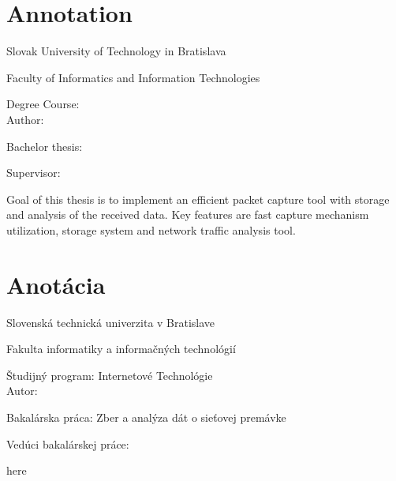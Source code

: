 
\thispagestyle{empty}

\section*{Annotation}

\begin{minipage}[t]{1\columnwidth}%
Slovak University of Technology in Bratislava 

Faculty of Informatics and Information Technologies

Degree Course: \myStudyProgram\\

Author: \myName

Bachelor thesis: \myTitle

Supervisor: \mySupervisor

\myDate%
\end{minipage}

\bigskip{}

Goal of this thesis is to implement an efficient packet capture tool with storage and analysis of the received data. Key features are fast capture mechanism utilization, storage system and network traffic analysis tool. 

\newpage{}\thispagestyle{empty}

\newpage
\thispagestyle{empty}
\mbox{}
\newpage

\thispagestyle{empty}
\section*{Anotácia}

\begin{minipage}[t]{1\columnwidth}%
Slovenská technická univerzita v Bratislave

Fakulta informatiky a informačných technológií

Študijný program: Internetové Technológie\\

Autor: \myName

Bakalárska práca: Zber a analýza dát o sieťovej premávke

Vedúci bakalárskej práce: \mySupervisor

\myDate%
\end{minipage}

\bigskip{}

here


\newpage{}\thispagestyle{empty}\medskip{}


\newpage{}

\newpage
\thispagestyle{empty}
\mbox{}
\newpage




